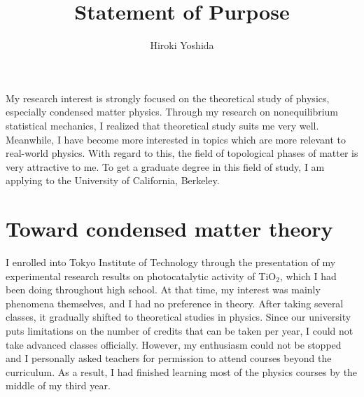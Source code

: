\documentclass[a4]{article}
\title{Statement of Purpose}
\author{Hiroki Yoshida}
\date{}
\begin{document}
\maketitle

My research interest is strongly focused on the theoretical study of physics, especially condensed matter physics. Through my research on nonequilibrium statistical mechanics, I realized that theoretical study suits me very well. Meanwhile, I have become more interested in topics which are more relevant to real-world physics. With regard to this, the field of topological phases of matter is very attractive to me. To get a graduate degree in this field of study, I am applying to the University of California, Berkeley.

\section{Toward condensed matter theory}
I enrolled into Tokyo Institute of Technology through the presentation of my experimental research results on photocatalytic activity of TiO$_2$, which I had been doing throughout high school. At that time, my interest was mainly phenomena themselves, and I had no preference in theory. After taking several classes, it gradually shifted to theoretical studies in physics. Since our university puts limitations on the number of credits that can be taken per year, I could not take advanced classes officially. However, my enthusiasm could not be stopped and I personally asked teachers for permission to attend courses beyond the curriculum. As a result, I had finished learning most of the physics courses by the middle of my third year.\par
\end{document}
